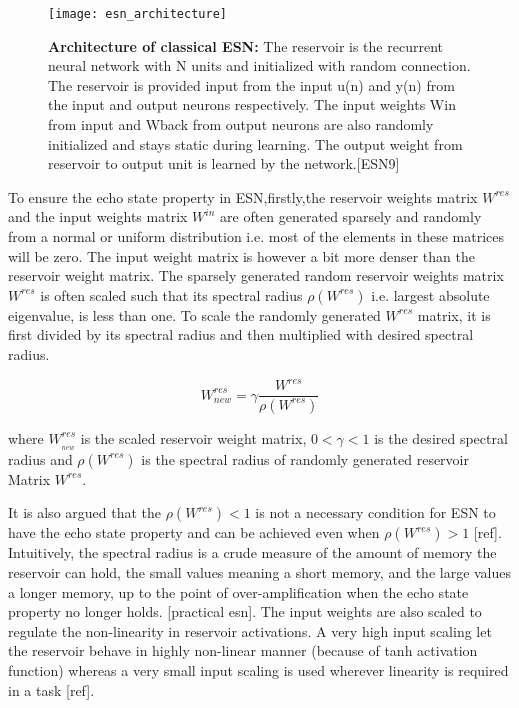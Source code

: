 \begin{figure}[hbtp]
\centering
\texttt{[image: esn\_architecture]}
\caption{\textbf{Architecture of classical ESN:} The reservoir is the recurrent neural network with N units and initialized with random connection. The reservoir is provided input from the input u(n) and y(n) from the input and output neurons  respectively. The input weights Win from input and Wback from output neurons are also randomly initialized and stays static during learning. The output  weight from reservoir to output unit is learned by the network.[ESN9]}
\label{fig:esn_arch}
\end{figure}

To ensure the echo state property in ESN,firstly,the reservoir weights matrix $W^{res}$ and the input weights matrix $W^{in}$ are often generated sparsely and randomly from a normal or uniform distribution i.e. most of the elements in these matrices will be zero.
The input weight matrix is however a bit more denser than the reservoir weight matrix.
The sparsely generated random reservoir weights matrix $W^{res}$ is often scaled such that its spectral radius $\rho(W^{res})$ i.e. largest absolute eigenvalue, is less than one. To scale the randomly generated $W^{res}$ matrix, it is first divided by its spectral radius and then multiplied with desired spectral radius.

\begin{equation}\label{eqn:res_scaling}
W_{new}^{{res}}=\gamma \frac{W^{res}}{\rho(W^{res})}
\end{equation}

where $W_{_{new}}^{{res}}$ is the scaled reservoir weight matrix, $0 < \gamma < 1$ is the desired spectral radius and $\rho(W^{res})$ is the spectral radius of randomly generated reservoir Matrix $W^{res}$.

It is also argued that the $\rho(W^{res}) < 1 $ is not a necessary condition for ESN to have the echo state property and can be achieved even when $\rho(W^{res}) > 1$ [ref]. Intuitively, the spectral radius is a crude measure of the amount of memory the reservoir can hold, the small values meaning a short memory, and the large values a longer memory, up to the point of over-amplification when the echo state property no longer holds. [practical esn]. The input weights are also scaled to regulate the non-linearity in reservoir activations. A very high input scaling let the reservoir behave in highly non-linear manner (because of tanh activation function) whereas a very small input scaling is used wherever linearity is required in a task [ref].

